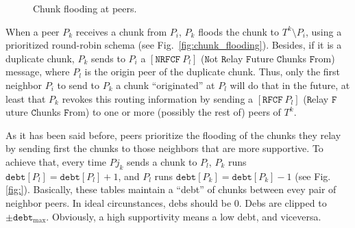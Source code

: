 \label{sec:chunk_flooding}
\begin{figure*}
  \caption{Chunk flooding at peers.\label{fig:peer_chunk_flooding}}
\end{figure*}
When a peer $P_k$ receives a chunk from $P_i$, $P_k$ floods the
chunk to $T^k \setminus P_i$, using a prioritized round-robin
schema (see Fig.~\ref{fig:chunk_flooding}). Besides, if
it is a duplicate chunk, $P_k$ sends to $P_i$ a
$[\mathtt{NRFCF}~P_l]$ ($\mathtt{N}$ot $\mathtt{R}$elay
$\mathtt{F}$uture $\mathtt{C}$hunks $\mathtt{F}$rom) message, where
$P_l$ is the origin peer of the duplicate chunk. Thus, only
the first neighbor $P_i$ to send to $P_k$ a chunk
``originated'' at $P_l$ will do that in the future, at least
that $P_k$ revokes this routing information by sending a
$[\mathtt{RFCF}~P_l]$ ($\mathtt{R}$elay $\mathtt{F}$uture
$\mathtt{C}$hunks $\mathtt{F}$rom) to one or more (possibly the rest
of) peers of $T^k$.

As it has been said before, peers prioritize the flooding of the
chunks they relay by sending first the chunks to those neighbors that
are more supportive. To achieve that, every time $Pj_k$ sends a chunk
to $P_l$, $P_k$ runs $\mathtt{debt}[P_l] = \mathtt{debt}[P_l]+1$, and
$P_l$ runs $\mathtt{debt}[P_k] = \mathtt{debt}[P_k]-1$ (see
Fig.\ref{fig:}). Basically, these tables maintain a ``debt'' of chunks
between evey pair of neighbor peers. In ideal circunstances, debs
should be $0$. Debs are clipped to
$\pm\mathtt{debt}_{\text{max}}$. Obviously, a high supportivity means
a low debt, and viceversa.

\begin{comment}
In each round, peers check if a chunk have been received from the rest
of peers of the team (${\cal P}_k\in {\cal T}_j)$). If not, peers send
a $[\mathtt{propagate}~{\cal P}_i]$ to one or more (possibly
to the rest of) peers of the team, where ${\cal P}_i$ is the origin peer
of the missing chunk. At this point, the process continues as
described in Section~\ref{dbs:chunk_flooding}.
\end{comment}

\begin{comment}
For each ${\cal P}_k\in N({\cal P}_i)$, ${\cal P}_i$ checks if a chunk
has been received from ${\cal P}_k$. If ${\cal P}_i$ detects that
${\cal P}_k$ has not sent a chunk to it during $L$ consecutive rounds,
performs $N({\cal P}_i) = N({\cal P}_i)\setminus{\cal P}_k$, and stops
sending to ${\cal P}_k$ more chunks.
\end{comment}
\begin{comment}
computes a
``chunk-debt'', denoted by $d({\cal P}_k)$, that is incremented each
time a chunk is received from ${\cal P}_k$ and decremented each time a
chunk is sent to ${\cal P}_k$. If ${\cal P}_i$ verifies that $d({\cal
  P}_k)>D$ (the maximum debt), then ${\cal P}_i$ considers that ${\cal
  P}_k$ is unable to communicate with it, performs $N({\cal P}_i) =
N({\cal P}_i)\setminus{\cal P}_k$, and stops sending to ${\cal P}_k$
more chunks.
\end{comment}


